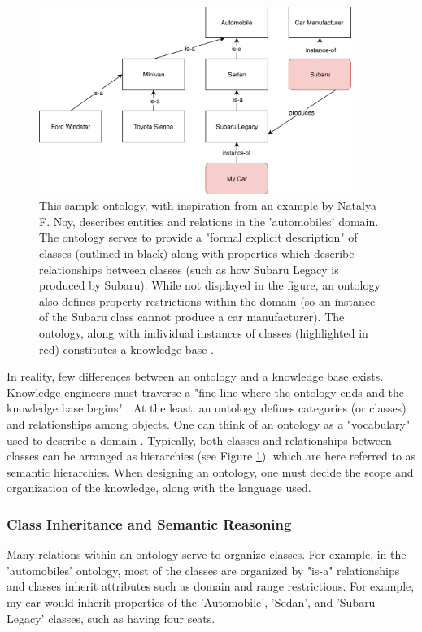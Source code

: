 \documentclass{article}
\begin{document}
\begin{figure}[h]
\centering
\includegraphics[width=4in]{sample_ontology}
\caption{This sample ontology, with inspiration from an example by Natalya F. Noy, describes entities and relations in the 'automobiles' domain. The ontology serves to provide a "formal explicit description" of classes (outlined in black) along with properties which describe relationships between classes (such as how Subaru Legacy is produced by Subaru). While not displayed in the figure, an ontology also defines property restrictions within the domain (so an instance of the Subaru class cannot produce a car manufacturer). The ontology, along with individual instances of classes (highlighted in red) constitutes a knowledge base \cite{noy2001ontology}. }
\label{fig:sample_ontology}
\end{figure}

In reality, few differences between an ontology and a knowledge base exists. Knowledge engineers must traverse a "fine line where the ontology ends and the knowledge base begins" \cite{noy2001ontology}. At the least, an ontology defines categories (or classes) and relationships among objects. One can think of an ontology as a "vocabulary" used to describe a domain \cite[308]{russell2016artificial}. Typically, both classes and relationships between classes can be arranged as hierarchies  (see Figure \ref{fig:sample_ontology}), which are here referred to as semantic hierarchies. When designing an ontology, one must decide the scope and organization of the knowledge, along with the language used. 

\subsubsection{Class Inheritance and Semantic Reasoning}

Many relations within an ontology serve to organize classes. For example, in the 'automobiles' ontology, most of the classes are organized by "is-a" relationships and classes inherit attributes such as domain and range restrictions. For example, my car would inherit properties of the 'Automobile', 'Sedan', and 'Subaru Legacy' classes, such as having four seats. 
\end{document}
